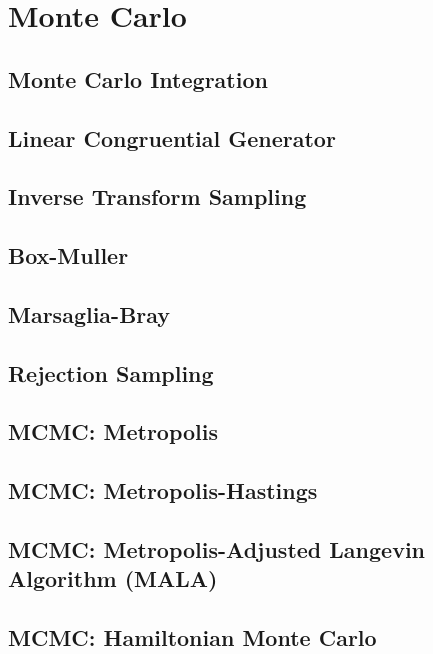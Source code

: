 \section{Monte Carlo}
\subsection{Monte Carlo Integration}
\subsection{Linear Congruential Generator}
\subsection{Inverse Transform Sampling}
\subsection{Box-Muller}
\subsection{Marsaglia-Bray}
\subsection{Rejection Sampling}
\subsection{MCMC: Metropolis}
\subsection{MCMC: Metropolis-Hastings}
\subsection{MCMC: Metropolis-Adjusted Langevin Algorithm (MALA)}
\subsection{MCMC: Hamiltonian Monte Carlo}
